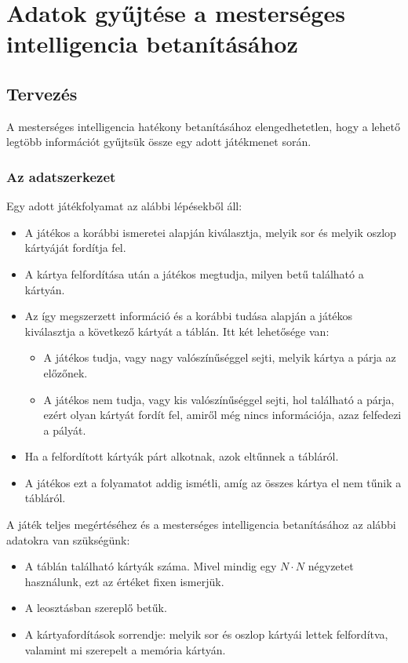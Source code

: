 \chapter{Adatok gyűjtése a mesterséges intelligencia betanításához}
\thispagestyle{fancy}
\pagestyle{fancy}

\section{Tervezés}
A mesterséges intelligencia hatékony betanításához elengedhetetlen, hogy a lehető legtöbb információt gyűjtsük össze egy adott játékmenet során.

\subsection{Az adatszerkezet}
Egy adott játékfolyamat az alábbi lépésekből áll:

\begin{itemize}
\item A játékos a korábbi ismeretei alapján kiválasztja, melyik sor és melyik oszlop kártyáját fordítja fel.
\item A kártya felfordítása után a játékos megtudja, milyen betű található a kártyán.
\item Az így megszerzett információ és a korábbi tudása alapján a játékos kiválasztja a következő kártyát a táblán. Itt két lehetősége van:
\begin{itemize}
\item A játékos tudja, vagy nagy valószínűséggel sejti, melyik kártya a párja az előzőnek.
\item A játékos nem tudja, vagy kis valószínűséggel sejti, hol található a párja, ezért olyan kártyát fordít fel, amiről még nincs információja, azaz felfedezi a pályát.
\end{itemize}
\item Ha a felfordított kártyák párt alkotnak, azok eltűnnek a tábláról.
\item A játékos ezt a folyamatot addig ismétli, amíg az összes kártya el nem tűnik a tábláról.
\end{itemize}

A játék teljes megértéséhez és a mesterséges intelligencia betanításához az alábbi adatokra van szükségünk:

\begin{itemize}
\item A táblán található kártyák száma. Mivel mindig egy $N \cdot N$ négyzetet használunk, ezt az értéket fixen ismerjük.
\item A leosztásban szereplő betűk.
\item A kártyafordítások sorrendje: melyik sor és oszlop kártyái lettek felfordítva, valamint mi szerepelt a memória kártyán.
\end{itemize}

